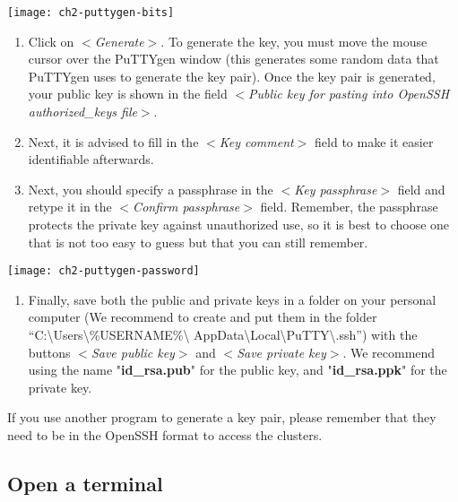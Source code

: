   \texttt{[image: ch2-puttygen-bits]}

  \begin{enumerate}
    \item  Click on $<$\textit{Generate}$>$. To generate the key, you must move
      the mouse cursor over the PuTTYgen window (this generates some random
      data that PuTTYgen uses to generate the key pair). Once the key pair is
      generated, your public key is shown in the field $<$\textit{Public key for pasting into OpenSSH authorized\_keys file}$>$.
    \item  Next, it is advised to fill in the $<$\textit{Key comment}$>$ field
      to make it easier identifiable afterwards.
    \item  Next, you should specify a passphrase in the $<$\textit{Key passphrase}$>$
      field and retype it in the $<$\textit{Confirm passphrase}$>$ field.
      Remember, the passphrase protects the private key against unauthorized
      use, so it is best to choose one that is not too easy to guess but that
      you can still remember.
  \end{enumerate}

  \texttt{[image: ch2-puttygen-password]}

  \begin{enumerate}
    \item  Finally, save both the public and private keys in a folder on your
      personal computer (We recommend to create and put them in the folder
      ``C:\textbackslash Users\textbackslash \%USERNAME\%\textbackslash
      AppData\textbackslash Local\textbackslash PuTTY\textbackslash .ssh'')
      with the buttons $<$\textit{Save public key}$>$ and $<$\textit{Save private key}$>$.
      We recommend using the name "\textbf{id_rsa.pub}" for the public key,
      and "\textbf{id\_rsa.ppk}" for the private key.
  \end{enumerate}

  If you use another program to generate a key pair, please remember that they
  need to be in the OpenSSH format to access the \hpc clusters.

\fi


\ifmac

  \subsection{Open a terminal}
  \label{sec:open-a-terminal}

